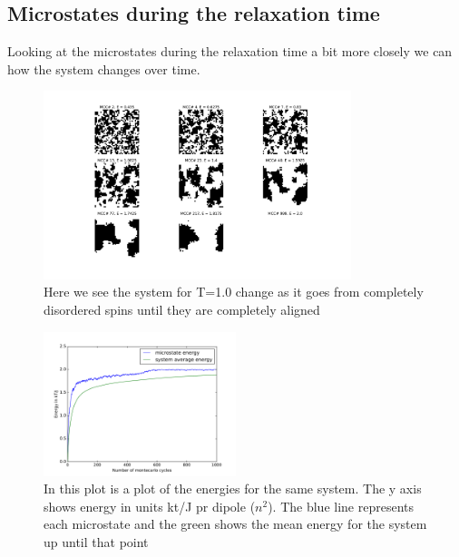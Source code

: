 \documentclass[a4paper, 12pt]{article}
\begin{document}
{\subsection{Microstates during the relaxation time}
	Looking at the microstates during the relaxation time a bit more closely we can how the system changes over time.
	\begin{figure}[H]
	\begin{center}
		\includegraphics[width=0.8\textwidth]{t1_1000mcc_graphical.pdf}
		\caption{Here we see the system for T=1.0 change as it goes from completely disordered spins until they are completely aligned}
	\end{center}
	\end{figure}
	
	\begin{figure}[H]
	\begin{center}
		\includegraphics[width=0.5\textwidth]{t1_1000mcc_energies.pdf}
		\caption{In this plot is a plot of the energies for the same system. The y axis shows energy in units kt/J pr dipole ($n^2$). The blue line represents each microstate and the green shows the mean energy for the system up until that point}
	\end{center}
	\end{figure}

}
\end{document}
